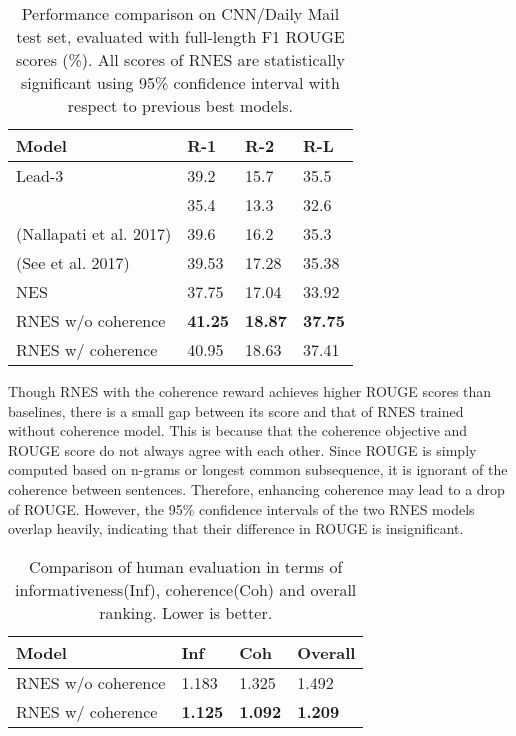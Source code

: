 \documentclass[letterpaper]{article} \usepackage{aaai18}  \usepackage{times}  \usepackage{helvet}  \usepackage{courier}  \usepackage{url}  \usepackage{graphicx}  \usepackage{amssymb}
\begin{document}
	\begin{table}[ht]
		\centering
		\caption{Performance comparison on CNN/Daily Mail test set, evaluated with full-length F1 ROUGE scores (\%). All scores of RNES are statistically significant using 95\% confidence interval with respect to previous best models.}
		\label{tab:rouge_cnn_dm}
		\begin{tabular}{|p{32mm}|p{12mm}|p{12mm}|p{11mm}|}
			\hline
			Model&R-1&R-2&R-L\\\hline
			Lead-3&39.2&15.7&35.5\\
			\cite{nallapati_ramesh_abstractive_2016}&35.4&13.3&32.6\\
			(Nallapati et al. 2017) &39.6&16.2&35.3\\
			(See et al. 2017)&39.53&17.28&35.38\\
			NES & 37.75 & 17.04 & 33.92\\\hline
			RNES w/o coherence&\textbf{41.25}&\textbf{18.87}&\textbf{37.75}\\
			RNES w/ coherence&40.95&18.63&37.41\\\hline
		\end{tabular}
	\end{table}


	Though RNES with the coherence reward achieves higher ROUGE scores than baselines, there is a small gap between its score and that of RNES trained without coherence model. This is because that the coherence objective and ROUGE score do not always agree with each other. Since ROUGE is simply computed based on n-grams or longest common subsequence, it is ignorant of the coherence between sentences. Therefore, enhancing coherence may lead to a drop of ROUGE. However, the 95\% confidence intervals of the two RNES models overlap heavily, indicating that their difference in ROUGE is insignificant.
	

	\begin{table}[ht]
	\centering
	\caption{Comparison of human evaluation in terms of informativeness(Inf), coherence(Coh) and overall ranking. Lower is better.}
	\label{tab:human_eval}
	
	\begin{tabular}{|p{31mm}|p{12mm}|p{12mm}|p{12mm}|}
		\hline
		Model&Inf&Coh&Overall\\\hline
		RNES w/o coherence&1.183&1.325&1.492 \\
		RNES w/ coherence& \textbf{1.125} & \textbf{1.092} & \textbf{1.209} \\\hline
	\end{tabular}
	\end{table}	
  
\end{document}
